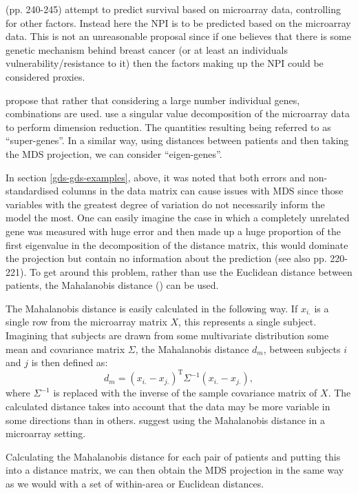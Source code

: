 \cite{ernstbook} (pp. 240-245) attempt to predict survival based on microarray data, controlling for other factors. Instead here the NPI is to be predicted based on the microarray data. This is not an unreasonable proposal since if one believes that there is some genetic mechanism behind breast cancer (or at least an individuals vulnerability/resistance to it) then the factors making up the NPI could be considered proxies. 

\cite{spang2002} propose that rather that considering a large number individual genes, combinations are used. \cite{spang2002} use a singular value decomposition of the microarray data to perform dimension reduction. The quantities resulting being referred to as ``super-genes''. In a similar way, using distances between patients and then taking the MDS projection, we can consider ``eigen-genes''.

In section \ref{gds-gds-examples}, above, it was noted that both errors and non-standardised columns in the data matrix can cause issues with MDS since those variables with the greatest degree of variation do not necessarily inform the model the most. One can easily imagine the case in which a completely unrelated gene was measured with huge error and then made up a huge proportion of the first eigenvalue in the decomposition of the distance matrix, this would dominate the projection but contain no information about the prediction (see also \cite{ernstbook} pp. 220-221). To get around this problem, rather than use the Euclidean distance between patients, the Mahalanobis distance (\cite{mahalanobis}) can be used.

The Mahalanobis distance is easily calculated in the following way. If $x_{i.}$ is a single row from the microarray matrix $X$, this represents a single subject. Imagining that subjects are drawn from some multivariate distribution some mean and covariance matrix $\Sigma$, the Mahalanobis distance $d_m$, between subjects $i$ and $j$ is then defined as:
\begin{equation}
d_m = (x_{i.} - x_{j.})^\text{T} \Sigma^{-1} (x_{i.} - x_{j.}),
\end{equation}
where $\Sigma^{-1}$ is replaced with the inverse of the sample covariance matrix of $X$. The calculated distance takes into account that the data may be more variable in some directions than in others. \cite{gentleman2005} suggest using the Mahalanobis distance in a microarray setting.

Calculating the Mahalanobis distance for each pair of patients and putting this into a distance matrix, we can then obtain the MDS projection in the same way as we would with a set of within-area or Euclidean distances.

